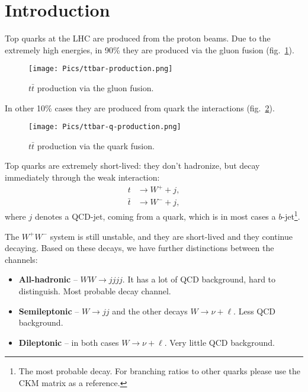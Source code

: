 \documentclass[a4paper, 12 pt, titlepage, twocolumn]{article}
\newcommand{\ttbar}{
	\ensuremath{t\bar{t}}
}
\newcommand{\tbar}{
	\ensuremath{\bar{t}}
}
\begin{document}
%
\pagebreak

\section{Introduction}

Top quarks at the LHC are produced from the proton beams. Due to the extremely high energies, in 90\% they are
produced via the gluon fusion (fig.~\ref{fig:production-g}).

\begin{figure}[H]
	\centering
	\texttt{[image: Pics/ttbar-production.png]}
	\caption{$\ttbar$ production via the gluon fusion.}
	\label{fig:production-g}
\end{figure}

In other 10\% cases they are produced from quark the interactions (fig.~\ref{fig:production-q}).

\begin{figure}[H]
	\centering
	\texttt{[image: Pics/ttbar-q-production.png]}
	\caption{$\ttbar$ production via the quark fusion.}
	\label{fig:production-q}
\end{figure}

Top quarks are extremely short-lived: they don't hadronize, but decay immediately through the weak
interaction:
\begin{align*}
	t &\to W^{+} + j, \\
	\tbar &\to W^- + j,
\end{align*}
where $j$ denotes a QCD-jet, coming from a quark, which is in most cases a $b$-jet\footnote{The most probable
decay. For branching ratios to other quarks please use the CKM matrix as a reference.}.


The $W^+W^-$ system is
still unstable, and they are short-lived and they continue decaying. Based on these decays, we have further
distinctions between the channels:

\begin{itemize}
	\item{{\bf All-hadronic} -- $WW \to jjjj$. It has a lot of QCD background, hard to distinguish. Most
		probable decay channel.}%
	\item{{\bf Semileptonic} -- $W \to jj$ and the other decays $W \to \nu + \ell$. Less QCD background.}
	\item{{\bf Dileptonic} -- in both cases $W \to \nu + \ell$. Very little QCD background.}
\end{itemize}
\end{document}
